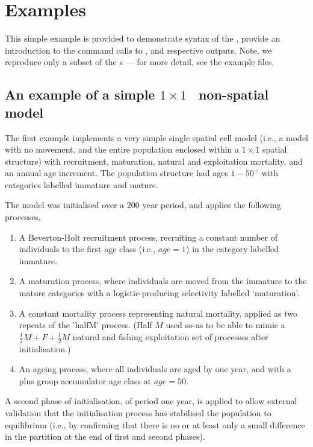 
\section{Examples\label{sec:examples}}

This simple example is provided to demonstrate syntax of the \config, provide an introduction to the command calls to \SPM, and respective outputs. Note, we reproduce only a subset of the \config s --- for more detail, see the example files. 

\subsection{An example of a simple
  \texorpdfstring{$ 1 \times 1 $}{%
    1 x 1
  }%
\ non-spatial model\label{example1}} 

The first example implements a very simple single spatial cell model (i.e., a model with no movement, and the entire population enclosed within a $1 \times 1$ spatial structure) with recruitment, maturation, natural and exploitation mortality, and an annual age increment. The population structure had ages $1-50^{+}$ with categories labelled immature and mature. 

The model was initialised over a 200 year period, and applies the following processes,

\begin{enumerate}
\item A Beverton-Holt recruitment process, recruiting a constant number of individuals to the first age class (i.e., $age=1$) in the category labelled immature.
\item A maturation process, where individuals are moved from the immature to the mature categories with a logistic-producing selectivity labelled `maturation'.
\item A constant mortality process representing natural mortality, applied as two repeats of the 'halfM' process. (Half $M$ used so-as to be able to mimic a $\frac{1}{2} M + F + \frac{1}{2} M$ natural and fishing exploitation set of processes after initialisation.)
\item An ageing process, where all individuals are aged by one year, and with a plus group accumulator age class at $age=50$.
\end{enumerate}

A second phase of initialisation, of period one year, is applied to allow external validation that the initialisation process has stabilised the population to equilibrium (i.e., by confirming that there is no or at least only a small difference in the partition at the end of first and second phases).

